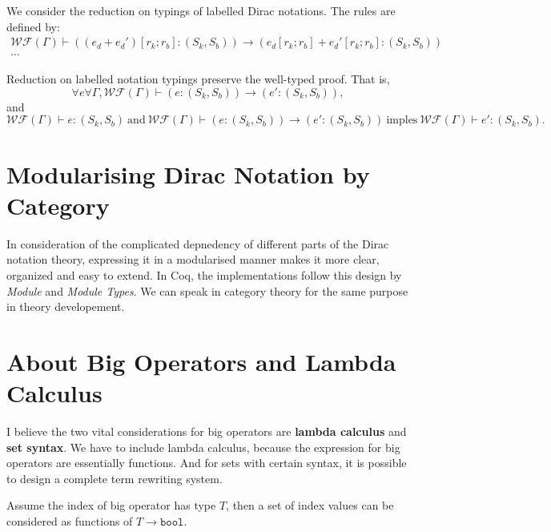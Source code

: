 \begin{definition}
  We consider the reduction on typings of labelled Dirac notations. The rules are defined by:
  \begin{gather*}
    \mathcal{WF}(\Gamma) \vdash ((e_d + e_d')[r_k; r_b]: (S_k, S_b)) \to (e_d[r_k; r_b] + e_d'[r_k; r_b] : (S_k, S_b))\\
    \cdots
  \end{gather*}
\end{definition}

\begin{claim}
  Reduction on labelled notation typings preserve the well-typed proof. That is,
  $$
  \forall e \forall \Gamma, \mathcal{WF}(\Gamma) \vdash (e : (S_k, S_b)) \to (e' : (S_k, S_b)),
  $$
  and
  $$
  \mathcal{WF}(\Gamma) \vdash e : (S_k, S_b)\ \textrm{and}\ \mathcal{WF}(\Gamma) \vdash (e : (S_k, S_b)) \to (e' : (S_k, S_b))\ \textrm{imples}\ \mathcal{WF}(\Gamma) \vdash e' : (S_k, S_b).
  $$
\end{claim}


\section{Modularising Dirac Notation by Category}
In consideration of the complicated depnedency of different parts of the Dirac notation theory, expressing it in a modularised manner makes it more clear, organized and easy to extend. In Coq, the implementations follow this design by \textit{Module} and \textit{Module Types}. We can speak in category theory for the same purpose in theory developement.



\section{About Big Operators and Lambda Calculus}
I believe the two vital considerations for big operators are \textbf{lambda calculus} and \textbf{set syntax}. We have to include lambda calculus, because the expression for big operators are essentially functions. And for sets with certain syntax, it is possible to design a complete term rewriting system.

Assume the index of big operator has type $T$, then a set of index values can be considered as functions of $T \to \texttt{bool}$.

